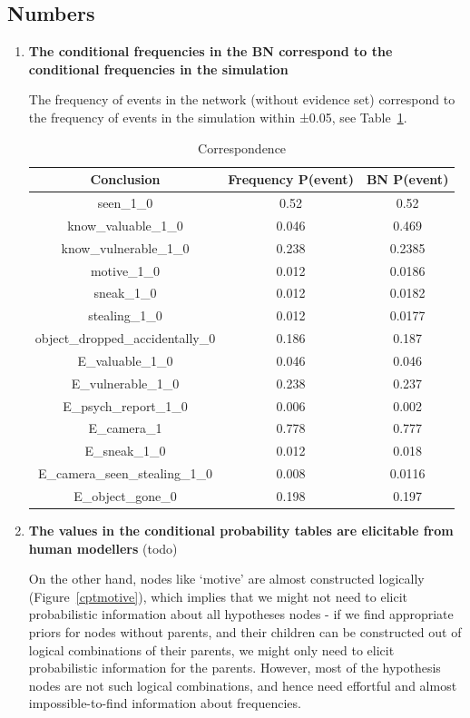 \subsection{Numbers}
\begin{enumerate}
\item \textbf{The conditional frequencies in the BN correspond to the conditional frequencies in the simulation}

The frequency of events in the network (without evidence set) correspond to the frequency of events in the simulation within ±0.05, see Table~\ref{testTableGM}.

\begin{table}
\centering
\begin{tabular}{|c|c|c|}
 \hline
 Conclusion & Frequency P(event) & BN P(event)\\
 \hline
seen\_1\_0    & 0.52& 0.52\\
know\_valuable\_1\_0  & 0.046 & 0.469\\
know\_vulnerable\_1\_0  &0.238 &  0.2385\\
motive\_1\_0  & 0.012 &  0.0186\\
sneak\_1\_0  & 0.012& 0.0182\\
stealing\_1\_0  & 0.012 & 0.0177\\
object\_dropped\_accidentally\_0  & 0.186 & 0.187 \\
E\_valuable\_1\_0  & 0.046 &  0.046\\
E\_vulnerable\_1\_0  &0.238 &  0.237\\
E\_psych\_report\_1\_0  & 0.006&  0.002\\
E\_camera\_1 & 0.778 & 0.777\\ 
E\_sneak\_1\_0  & 0.012& 0.018\\
E\_camera\_seen\_stealing\_1\_0  & 0.008 & 0.0116 \\
E\_object\_gone\_0  & 0.198 & 0.197 \\
 \hline
\end{tabular}
\caption{Correspondence}
\label{testTableGM}
\end{table}

\item \textbf{The values in the conditional probability tables are elicitable from human modellers}
(todo)


On the other hand, nodes like `motive' are almost constructed logically (Figure~\ref{cptmotive}), which implies that we might not need to elicit probabilistic information about all hypotheses nodes - if we find appropriate priors for nodes without parents, and their children can be constructed out of logical combinations of their parents, we might only need to elicit probabilistic information for the parents. However, most of the hypothesis nodes are not such logical combinations, and hence need effortful and almost impossible-to-find information about frequencies.


\end{enumerate}
